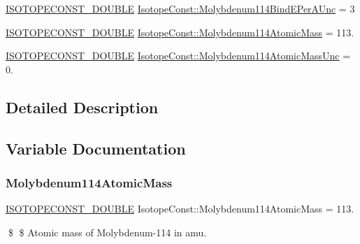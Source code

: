 \begin{DoxyCompactItemize}
\mbox{\hyperlink{group___isotope_const-_macros_ga8f45a7272ce02c0b4c65c44636ed719a}{I\+S\+O\+T\+O\+P\+E\+C\+O\+N\+S\+T\+\_\+\+D\+O\+U\+B\+LE}} \mbox{\hyperlink{group___isotope_const-_molybdenum-_mo114_gaefa9e01792df63807f9660921589f0b7}{Isotope\+Const\+::\+Molybdenum114\+Bind\+E\+Per\+A\+Unc}} = 3
\item 
\mbox{\hyperlink{group___isotope_const-_macros_ga8f45a7272ce02c0b4c65c44636ed719a}{I\+S\+O\+T\+O\+P\+E\+C\+O\+N\+S\+T\+\_\+\+D\+O\+U\+B\+LE}} \mbox{\hyperlink{group___isotope_const-_molybdenum-_mo114_ga7a8fae401d0be98a1c120fd92df65201}{Isotope\+Const\+::\+Molybdenum114\+Atomic\+Mass}} = 113.
\item 
\mbox{\hyperlink{group___isotope_const-_macros_ga8f45a7272ce02c0b4c65c44636ed719a}{I\+S\+O\+T\+O\+P\+E\+C\+O\+N\+S\+T\+\_\+\+D\+O\+U\+B\+LE}} \mbox{\hyperlink{group___isotope_const-_molybdenum-_mo114_ga0d942af092057a2a14f57397754f7763}{Isotope\+Const\+::\+Molybdenum114\+Atomic\+Mass\+Unc}} = 0.
\end{DoxyCompactItemize}


\subsection{Detailed Description}


\subsection{Variable Documentation}
\mbox{\label{group___isotope_const-_molybdenum-_mo114_ga7a8fae401d0be98a1c120fd92df65201}} 
\subsubsection{\texorpdfstring{Molybdenum114\+Atomic\+Mass}{Molybdenum114AtomicMass}}
{\footnotesize\ttfamily \mbox{\hyperlink{group___isotope_const-_macros_ga8f45a7272ce02c0b4c65c44636ed719a}{I\+S\+O\+T\+O\+P\+E\+C\+O\+N\+S\+T\+\_\+\+D\+O\+U\+B\+LE}} Isotope\+Const\+::\+Molybdenum114\+Atomic\+Mass = 113.}

\$ \$ Atomic mass of Molybdenum-\/114 in amu. \mbox{\label{group___isotope_const-_molybdenum-_mo114_ga0d942af092057a2a14f57397754f7763}} 
